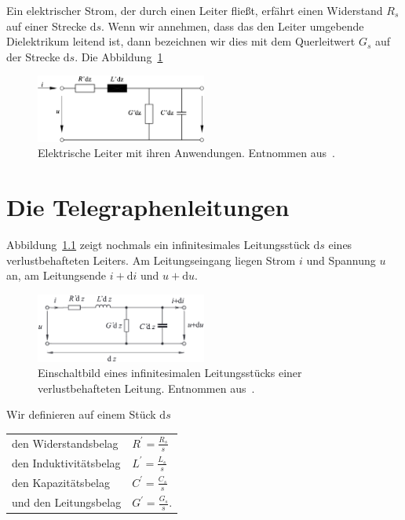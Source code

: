 \documentclass[paper=a4, parskip=half-, ngerman, fontsize=11pt]{scrreprt}
\begin{document}
Ein elektrischer Strom, der durch einen Leiter fließt, erfährt einen Widerstand $R_{s}$ auf einer Strecke
$\mathrm{d}s$. Wenn wir annehmen, dass das den Leiter umgebende Dielektrikum leitend ist, dann bezeichnen wir dies mit
dem Querleitwert
$G_{s}$ auf der Strecke $\mathrm{d}s$. Die Abbildung~\ref{Leitung3}
\begin{figure}[!h]
    \begin{center}
        \includegraphics[width=0.5\textwidth]{images/Leitungsstueck.png}
        \caption{Elektrische Leiter mit ihren Anwendungen. Entnommen aus~\cite{LeitungenUndFilter}.}
        \label{Leitung3}
    \end{center}
\end{figure}



\chapter{Die Telegraphenleitungen}
Abbildung~\ref{Leitung4} zeigt nochmals ein infinitesimales Leitungsstück $\mathrm{d}s$ eines verlustbehafteten
Leiters. Am Leitungseingang liegen Strom $i$ und Spannung $u$ an, am Leitungsende $i + \mathrm{d}i$ und $u +
\mathrm{d}u$.
\begin{figure}[!h]
    \begin{center}
        \includegraphics[width=0.5\textwidth]{images/Leitungsstueck2.png}
        \caption{Einschaltbild eines infinitesimalen Leitungsstücks einer verlustbehafteten Leitung. Entnommen
        aus~\cite{LeitungenUndFilter}.}
        \label{Leitung4}
    \end{center}
\end{figure}

Wir definieren auf einem Stück $\mathrm{d}s$

\begin{tabular}{l l}
    den Widerstandsbelag & $R^{\prime} = \frac{R_{s}}{s}$ \\
\addlinespace
    den Induktivitätsbelag & $L^{\prime} = \frac{L_{s}}{s}$ \\
\addlinespace
    den Kapazitätsbelag & $C^{\prime} = \frac{C_{s}}{s}$ \\
\addlinespace
    und den Leitungsbelag & $G^{\prime} = \frac{G_{s}}{s}$. \\
\end{tabular}
\end{document}
